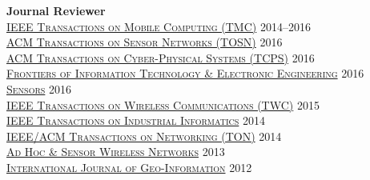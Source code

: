 {\bf Journal Reviewer}\\
{\href{http://www.computer.org/portal/web/tmc}{\textsc{IEEE Transactions on Mobile Computing (TMC)}}} \hfill 2014--2016\\
{\href{http://tosn.acm.org/}{\textsc{ACM Transactions on Sensor Networks (TOSN)}}} \hfill 2016\\
{\href{http://tcps.acm.org/}{\textsc{ACM Transactions on Cyber-Physical Systems (TCPS)}}} \hfill 2016\\
{\href{http://www.springer.com/computer/journal/11714}{\textsc{Frontiers of Information Technology \& Electronic Engineering}}} \hfill 2016\\
{\href{http://www.mdpi.com/journal/sensors}{\textsc{Sensors}}} \hfill 2016\\
{\href{http://www.comsoc.org/twc}{\textsc{IEEE Transactions on Wireless Communications (TWC)}}} \hfill 2015\\
{\href{http://tii.ieee-ies.org}{\textsc{IEEE Transactions on Industrial Informatics}}} \hfill 2014\\
{\href{http://www.ifp.illinois.edu/ton}{\textsc{IEEE/ACM Transactions on Networking (TON)}}} \hfill 2014\\
{\href{http://www.oldcitypublishing.com/AHSWN/AHSWN.html}{\textsc{Ad Hoc \& Sensor Wireless Networks}}} \hfill 2013\\
{\href{http://www.mdpi.com/journal/ijgi}{\textsc{International Journal of Geo-Information}}} \hfill 2012\\
